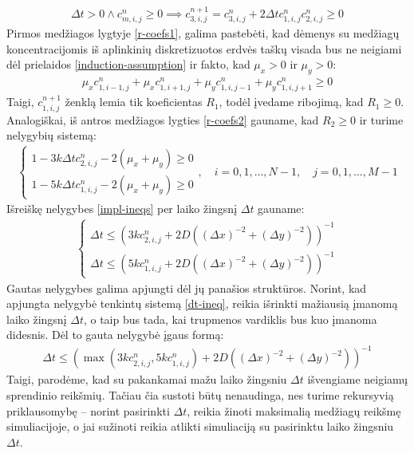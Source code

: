 \begin{align*}
  \Delta t > 0 \land c^n_{m,i,j}\geqslant 0 \implies c^{n+1}_{3,i,j}=c^n_{3,i,j}+2\Delta tc^{n}_{1,i,j}c^{n}_{2,i,j}\geqslant 0 
\end{align*}
Pirmos medžiagos lygtyje \eqref{r-coefs1}, galima pastebėti, kad dėmenys su medžiagų koncentracijomis iš aplinkinių diskretizuotos erdvės taškų visada bus ne neigiami dėl prielaidos \eqref{induction-assumption} ir fakto, kad $\mu_x>0$ ir $\mu_y>0$:
\begin{align*}
  \mu_xc^n_{1,i-1,j}+\mu_xc^n_{1,i+1,j}+\mu_yc^n_{1,i,j-1}+\mu_yc^n_{1,i,j+1}\geqslant 0
\end{align*}
\newpage
Taigi, $c^{n+1}_{1,i,j}$ ženklą lemia tik koeficientas $R_1$, todėl įvedame ribojimą, kad $R_1\geqslant 0$. Analogiškai, iš antros medžiagos lygties \eqref{r-coefs2} gauname, kad $R_2\geqslant 0$ ir turime nelygybių sistemą:
\begin{align} \label{impl-ineqs}
  \begin{cases}
    1-3k\Delta tc^{n}_{2,i,j}-2(\mu_x+\mu_y)\geqslant 0\\
    1-5k\Delta tc^{n}_{1,i,j}-2(\mu_x+\mu_y)\geqslant 0
  \end{cases}, \quad i=0,1,\dots,N-1, \quad j=0,1,\dots,M-1
\end{align}
Išreiškę nelygybes \eqref{impl-ineqs} per laiko žingsnį $\Delta t$ gauname:
\begin{align} \label{dt-ineq}
  \begin{cases}
    \Delta t \leqslant (3kc^{n}_{2,i,j}+2D((\Delta x)^{-2}+(\Delta y)^{-2}))^{-1}\\
    \Delta t \leqslant (5kc^{n}_{1,i,j}+2D((\Delta x)^{-2}+(\Delta y)^{-2}))^{-1}
  \end{cases}
\end{align}
Gautas nelygybes galima apjungti dėl jų panašios struktūros. Norint, kad apjungta nelygybė tenkintų sistemą \eqref{dt-ineq}, reikia išrinkti mažiausią įmanomą laiko žingsnį $\Delta t$, o taip bus tada, kai trupmenos vardiklis bus kuo įmanoma didesnis. Dėl to gauta nelygybė įgaus formą:
\begin{align}
  \Delta t \leqslant \left(\max(3kc^{n}_{2,i,j}, 5kc^{n}_{1,i,j})+2D\left((\Delta x)^{-2}+(\Delta y)^{-2}\right)\right)^{-1}
\end{align}
Taigi, parodėme, kad su pakankamai mažu laiko žingsniu $\Delta t$ išvengiame neigiamų sprendinio reikšmių. Tačiau čia sustoti būtų nenaudinga, nes turime rekursyvią priklausomybę -- norint pasirinkti $\Delta t$, reikia žinoti maksimalią medžiagų reikšmę simuliacijoje, o jai sužinoti reikia atlikti simuliaciją su pasirinktu laiko žingsniu $\Delta t$.

